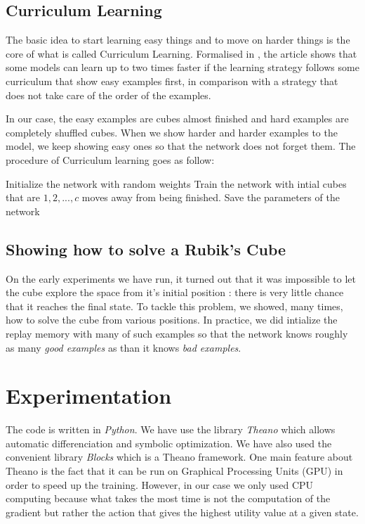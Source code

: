 \documentclass{article} %
\begin{document}
\subsection{Curriculum Learning}
The basic idea to start learning easy things and to move on harder things is the core of what is called Curriculum Learning. Formalised in \cite{curriculum}, the article shows that some models can learn up to two times faster if the learning strategy follows some curriculum that show easy examples first, in comparison with a strategy that does not take care of the order of the examples.

In our case, the easy examples are cubes almost finished and hard examples are completely shuffled cubes. When we show harder and harder examples to the model, we keep showing easy ones so that the network does not forget them. The procedure of Curriculum learning goes as follow:

\begin{algorithm}
\begin{algorithmic}[1]
\STATE Initialize the network with random weights
\STATE Train the network with intial cubes that are $1, 2, ..., c$ moves away from being finished.
\STATE Save the parameters of the network

\ENDFOR
\end{algorithmic}
\end{algorithm}

\subsection{Showing how to solve a Rubik's Cube}
On the early experiments we have run, it turned out that it was impossible to let the cube explore the space from it's initial position : there is very little chance that it reaches the final state. To tackle this problem, we showed, many times, how to solve the cube from various positions. In practice, we did intialize the replay memory with many of such examples so that the  network knows roughly as many \textit{good examples} as than it knows \textit{bad examples}.


\section{Experimentation}

The code is written in \textit{Python}. We have use the library \textit{Theano} which allows automatic differenciation and symbolic optimization. We have also used the convenient library \textit{Blocks} which is a Theano framework. One main feature about Theano is the fact that it can be run on Graphical Processing Units (GPU) in order to speed up the training. However, in our case we only used CPU computing because what takes the most time is not the computation of the gradient but rather the action that gives the highest utility value at a given state.
\end{document}

